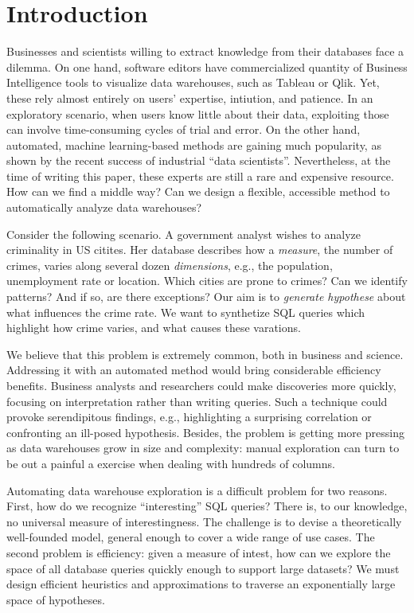 \section{Introduction}
\label{sec:intro}

Businesses and scientists willing to extract knowledge from their databases
face a dilemma. On one hand, software editors have commercialized quantity of
Business Intelligence tools to visualize data warehouses, such as Tableau or
Qlik. Yet, these rely almost entirely on users' expertise, intiution, and
patience. In an exploratory scenario, when users know little about their data,
exploiting those can involve time-consuming cycles of trial and error. On the
other hand, automated, machine learning-based methods are gaining much
popularity, as shown by the recent success of industrial ``data
scientists''. Nevertheless, at the time of writing this paper, these experts
are still a rare and expensive resource. How can we find a middle way? Can we
design a flexible, accessible method to automatically analyze data warehouses?

Consider the following scenario. A government analyst wishes to analyze
criminality in US citites. Her database describes how a \emph{measure}, the
number of crimes, varies along several dozen \emph{dimensions}, e.g., the
population, unemployment rate or location. Which cities are prone to crimes?
Can we identify patterns? And if so, are there exceptions? Our aim is to
\emph{generate hypothese} about what influences the crime rate. We want to
synthetize SQL queries which highlight how crime varies, and what causes these
varations.

We believe that this problem is extremely common, both in business and science.
Addressing it with an automated method would bring considerable efficiency
benefits. Business analysts and researchers could make discoveries more
quickly, focusing on interpretation rather than writing queries. Such a
technique could provoke serendipitous findings, e.g., highlighting a surprising
correlation or confronting an ill-posed hypothesis.  Besides, the problem is
getting more pressing as data warehouses grow in size and complexity: manual
exploration can turn to be out a painful a exercise when dealing with hundreds
of columns.

Automating data warehouse exploration is a difficult problem for
two reasons.  First, how do we recognize ``interesting'' SQL queries?  There
is, to our knowledge, no universal measure of interestingness. The challenge is
to devise a theoretically well-founded model, general enough to cover a wide
range of use cases. The second problem is efficiency: given a measure of
intest, how can we explore the space of all database queries quickly enough to
support large datasets? We must design efficient heuristics and approximations
to traverse an exponentially large space of hypotheses.

